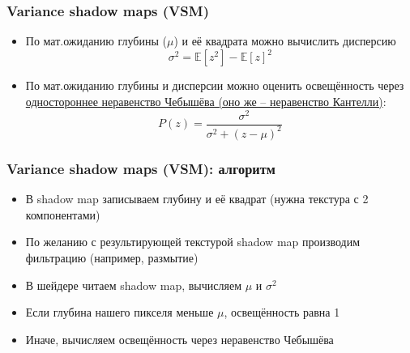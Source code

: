 \documentclass[10pt]{beamer}
\begin{document}
\begin{frame}[fragile]
\frametitle{Variance shadow maps (VSM)}
\begin{itemize}
\item По мат.ожиданию глубины (\begin{math}\mu\end{math}) и её квадрата можно вычислить дисперсию
\begin{equation}
\sigma^2 = \mathbb{E}[z^2] - \mathbb{E}[z]^2
\end{equation}
\pause
\item По мат.ожиданию глубины и дисперсии можно оценить освещённость через \href{https://en.wikipedia.org/wiki/Cantelli%27s_inequality}{одностороннее неравенство Чебышёва (оно же -- неравенство Кантелли)}:
\begin{equation}
P(z) = \frac{\sigma^2}{\sigma^2 + (z - \mu)^2}
\end{equation}
\end{itemize}
\end{frame}

\begin{frame}[fragile]
\frametitle{Variance shadow maps (VSM): алгоритм}
\begin{itemize}
\item В shadow map записываем глубину и её квадрат (нужна текстура с 2 компонентами)
\pause
\item По желанию с результирующей текстурой shadow map производим фильтрацию (например, размытие)
\pause
\item В шейдере читаем shadow map, вычисляем \begin{math}\mu\end{math} и \begin{math}\sigma^2\end{math}
\pause
\item Если глубина нашего пикселя меньше \begin{math}\mu\end{math}, освещённость равна 1
\pause
\item Иначе, вычисляем освещённость через неравенство Чебышёва
\end{itemize}
\end{frame}
\end{document}
